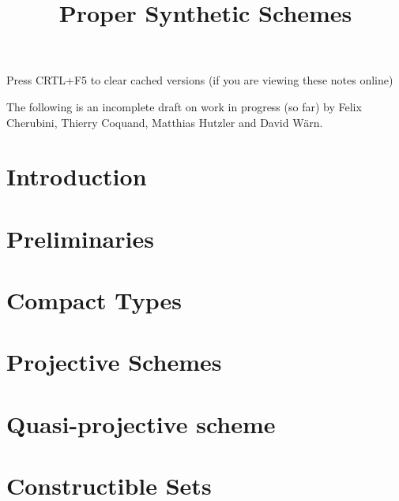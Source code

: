 \documentclass{../util/zariski}
\title{Proper Synthetic Schemes}
\begin{document}
\maketitle

\begin{center}
  \color{purple}
  \large{Press CRTL+F5 to clear cached versions}
  \large{(if you are viewing these notes online)}
\end{center}

The following is an incomplete draft on work in progress (so far)
by Felix Cherubini, Thierry Coquand, Matthias Hutzler and David Wärn.

\tableofcontents


\section*{Introduction}


\section{Preliminaries}


\section{Compact Types}


\section{Projective Schemes}


\section{Quasi-projective scheme}


\section{Constructible Sets}


\printindex

\printbibliography
\end{document}
